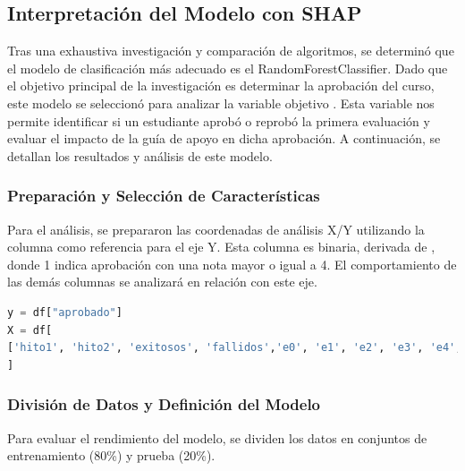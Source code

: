 \subsection{Interpretación del Modelo con SHAP}

Tras una exhaustiva investigación y comparación de algoritmos, se determinó que el modelo de clasificación más adecuado es el RandomForestClassifier. Dado que el objetivo principal de la investigación es determinar la aprobación del curso, este modelo se seleccionó para analizar la variable objetivo . Esta variable nos permite identificar si un estudiante aprobó o reprobó la primera evaluación y evaluar el impacto de la guía de apoyo en dicha aprobación. A continuación, se detallan los resultados y análisis de este modelo.

\subsubsection{Preparación y Selección de Características}

Para el análisis, se prepararon las coordenadas de análisis X/Y utilizando la columna  como referencia para el eje Y. Esta columna es binaria, derivada de , donde 1 indica aprobación con una nota mayor o igual a 4. El comportamiento de las demás columnas se analizará en relación con este eje.


\begin{lstlisting}[language=Python, caption=Selección de características y variable objetivo para RandomForestClassifier, label=lst:seleccion_caracteristicasRFC]
y = df["aprobado"]
X = df[
['hito1', 'hito2', 'exitosos', 'fallidos','e0', 'e1', 'e2', 'e3', 'e4', 'e5', 'e6', 'e7', 'e8', 'e9', 'e10', 'e11', 'e12', 'e13', 'e14', 'e15', 'e16', 'e17', 'e18', 'e19', 'e20', 'e21', 'e22', 'e23', 'e24', 'e25', 'e26', 'e27', 'e28', 'e29', 'e30', 'e31', 'e32', 'e33', 'e34', 'e35', 'e36', 'e37', 'e38', 'e39', 'e40', 'e41', 'e42', 'e43', 'e44', 'e45', 'e46', 'e47', 'e48', 'e49', 'e50', 'e51', 'e52']
]
\end{lstlisting}

\subsubsection{División de Datos y Definición del Modelo}

Para evaluar el rendimiento del modelo, se dividen los datos en conjuntos de entrenamiento (80\%) y prueba (20\%).

